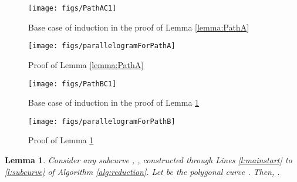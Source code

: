 \documentclass[12pt]{dalthesis}
\newtheorem{lemma}[theorem]{Lemma}
\begin{document}
\begin{figure}[h]
	\centering
	\texttt{[image: figs/PathAC1]}
	\caption{Base case of induction in the proof of Lemma \ref{lemma:PathA}}
	\label{fig:PathAClause1}
\end{figure}






\begin{figure}
	\centering
	\texttt{[image: figs/parallelogramForPathA]}
	\caption{Proof of Lemma \ref{lemma:PathA}}
	\label{fig:PathA}
\end{figure}
	



\begin{figure}[h]
	\centering
	\texttt{[image: figs/PathBC1]}
	\caption{Base case of induction in the proof of Lemma \ref{lemma:PathB} }
	\label{fig:PathBBaseCase}
\end{figure}



\begin{figure}[h]

	\centering
	\texttt{[image: figs/parallelogramForPathB]}
	\caption{Proof of Lemma \ref{lemma:PathB}}
	\label{fig:PathB}
\end{figure}


\begin{lemma}\label{lemma:PathB}
Consider any subcurve , ,  
constructed through Lines \ref{l:mainstart} to \ref{l:subcurve} 
of Algorithm \ref{alg:reduction}. Let  be the polygonal curve  . Then, .
\end{lemma}
\end{document}
